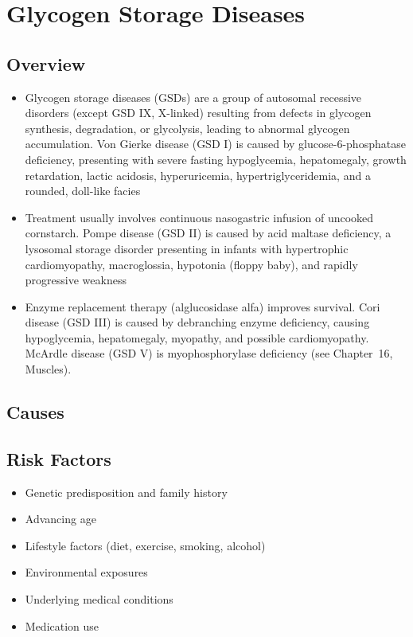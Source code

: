 \chapter{Glycogen Storage Diseases}
\label{sec:Glycogen Storage Diseases}

\section{Overview}


\begin{itemize}[noitemsep]
  \item Glycogen storage diseases (GSDs) are a group of autosomal recessive disorders (except GSD IX, X-linked) resulting from defects in glycogen synthesis, degradation, or glycolysis, leading to abnormal glycogen accumulation. Von Gierke disease (GSD I) is caused by glucose-6-phosphatase deficiency, presenting with severe fasting hypoglycemia, hepatomegaly, growth retardation, lactic acidosis, hyperuricemia, hypertriglyceridemia, and a rounded, doll-like facies
  \item Treatment usually involves continuous nasogastric infusion of uncooked cornstarch. Pompe disease (GSD II) is caused by acid maltase deficiency, a lysosomal storage disorder presenting in infants with hypertrophic cardiomyopathy, macroglossia, hypotonia (floppy baby), and rapidly progressive weakness
  \item Enzyme replacement therapy (alglucosidase alfa) improves survival. Cori disease (GSD III) is caused by debranching enzyme deficiency, causing hypoglycemia, hepatomegaly, myopathy, and possible cardiomyopathy. McArdle disease (GSD V) is myophosphorylase deficiency (see Chapter~16, Muscles).
\end{itemize}
\section{Causes}
\section{Risk Factors}

\begin{itemize}[noitemsep]
  \item Genetic predisposition and family history
  \item Advancing age
  \item Lifestyle factors (diet, exercise, smoking, alcohol)
  \item Environmental exposures
  \item Underlying medical conditions
  \item Medication use
\end{itemize}
